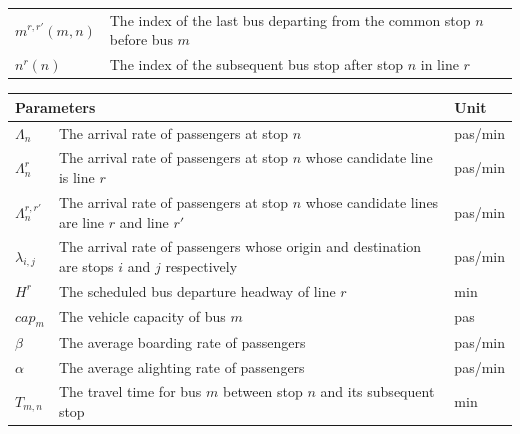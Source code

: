 \documentclass[smallextended]{svjour3}       %
\begin{document}
\begin{Abstract}
\begin{table}[H]
\begin{tabular}{p{1.5cm}p{8.5cm}}
      $m^{r,r'}(m,n)$                 & The index of the last bus departing from the common stop $n$ before bus $m$         \\ 
      $n^{r}(n)$                      & The index of the subsequent bus stop after stop $n$ in line $r$                     \\ 
  \end{tabular}
    \begin{tabular}{p{1.5cm}p{7cm}p{1.1cm}}
      \hline
      \multicolumn{2}{l}{Parameters}                                                                                                   & Unit\\ \hline
      $\Lambda_{n}$                   & The arrival rate of passengers at stop $n$                                                     & pas/min \\ 
      $\Lambda_{n}^{r}$               & The arrival rate of passengers at stop $n$ whose candidate line is line $r$                    & pas/min \\ 
      $\Lambda_{n}^{r,r'}$            & The arrival rate of passengers at stop $n$ whose candidate lines are line $r$ and line $r'$    & pas/min \\ 
      $\lambda_{i,j}$                 & The arrival rate of passengers whose origin and destination are stops $i$ and $j$ respectively & pas/min \\ 
      $H^{r}$                         & The scheduled bus departure headway of line $r$                                                & min     \\ 
      $cap_{m}$                       & The vehicle capacity of bus $m$                                                                & pas     \\ 
      $\beta$                         & The average boarding rate of passengers                                                        & pas/min \\ 
      $\alpha$                        & The average alighting rate of passengers                                                       & pas/min \\ 
      $T_{m,n}$                       & The travel time for bus $m$ between stop $n$ and its subsequent stop                           & min     \\\hline
  \end{tabular}
  \end{table}\newpage

\end{Abstract}
\end{document}
